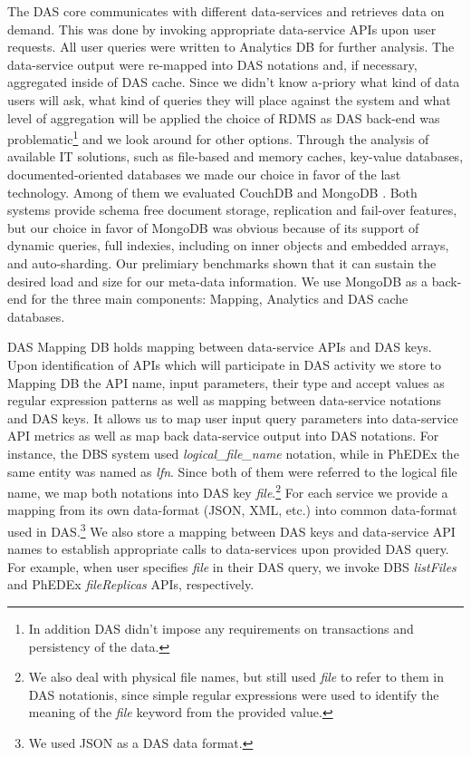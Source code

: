 \documentclass[a4paper]{jpconf}
\begin{document}
The DAS core communicates with different data-services and retrieves
data on demand. This was done by invoking appropriate data-service APIs
upon user requests. All user queries were written to Analytics DB
for further analysis. The data-service output were re-mapped into
DAS notations and, if necessary, aggregated inside of DAS cache.
Since we didn't know a-priory what kind of data users will ask, 
what kind of queries they will place against the system and what
level of aggregation will be applied the choice
of RDMS as DAS back-end was problematic\footnote{In addition DAS 
didn't impose any requirements on transactions and persistency of the data.} 
and we look around for other options. Through the analysis of available IT solutions, 
such as file-based and memory caches, 
key-value databases, documented-oriented databases we made our choice in favor 
of the last technology. Among of them we evaluated CouchDB \cite{CouchDB} and 
MongoDB \cite{MongoDB}. Both systems provide schema free document
storage, replication and fail-over features, but our choice in favor of 
MongoDB was obvious because of its support of dynamic queries, 
full indexies, including on inner objects and embedded arrays,
and auto-sharding. Our prelimiary benchmarks shown that it can sustain
the desired load and size for our meta-data information. We use MongoDB as a back-end 
for the three main components: Mapping, Analytics and DAS cache databases. 

DAS Mapping DB holds mapping between data-service APIs and DAS keys. 
Upon identification of APIs which will participate in DAS activity 
we store to Mapping DB the API name, input parameters, their type and accept 
values as regular expression patterns as well as mapping between data-service 
notations and DAS keys. It allows us to map user input query parameters into
data-service API metrics as well as map back data-service output into DAS notations.
For instance, the DBS system \cite{DBS}
used {\it logical\_file\_name} notation, while in PhEDEx
\cite{PhEDEx}
the same entity was named as {\it lfn}. Since both of them were referred to
the logical file name, we map both notations into DAS key {\it file}.\footnote{We
also deal with physical file names, but still used {\it file} to refer to them in
DAS notationis, since simple regular expressions were used to identify the
meaning of the {\it file} keyword from the provided value.}
For each service we provide a mapping from its own data-format (JSON, XML, etc.) into
common data-format used in DAS.\footnote{We used JSON as a DAS data format.}
We also store a mapping between DAS keys and data-service API names to
establish appropriate calls to data-services upon provided DAS query. For example,
when user specifies {\it file} in their DAS query, we invoke DBS 
{\it listFiles} and PhEDEx {\it fileReplicas} APIs, respectively.
\end{document}
